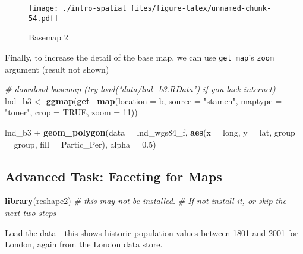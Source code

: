 \documentclass[]{article}
\newenvironment{Shaded}{}{}
\newcommand{\KeywordTok}[1]{\textcolor[rgb]{0.00,0.44,0.13}{\textbf{{#1}}}}
\newcommand{\DataTypeTok}[1]{\textcolor[rgb]{0.56,0.13,0.00}{{#1}}}
\newcommand{\DecValTok}[1]{\textcolor[rgb]{0.25,0.63,0.44}{{#1}}}
\newcommand{\FloatTok}[1]{\textcolor[rgb]{0.25,0.63,0.44}{{#1}}}
\newcommand{\StringTok}[1]{\textcolor[rgb]{0.25,0.44,0.63}{{#1}}}
\newcommand{\CommentTok}[1]{\textcolor[rgb]{0.38,0.63,0.69}{\textit{{#1}}}}
\newcommand{\OtherTok}[1]{\textcolor[rgb]{0.00,0.44,0.13}{{#1}}}
\newcommand{\NormalTok}[1]{{#1}}
\begin{document}
\begin{figure}[htbp]
\centering
\texttt{[image: ./intro-spatial\_files/figure-latex/unnamed-chunk-54.pdf]}
\caption{Basemap 2}
\end{figure}

Finally, to increase the detail of the base map, we can use
\texttt{get\_map}'s \texttt{zoom} argument (result not shown)

\begin{Shaded}
\begin{Highlighting}[]
\CommentTok{# download basemap (try load("data/lnd_b3.RData") if you lack internet)}
\NormalTok{lnd_b3 <-}\StringTok{ }\KeywordTok{ggmap}\NormalTok{(}\KeywordTok{get_map}\NormalTok{(}\DataTypeTok{location =} \NormalTok{b, }\DataTypeTok{source =} \StringTok{"stamen"}\NormalTok{,}
  \DataTypeTok{maptype =} \StringTok{"toner"}\NormalTok{, }\DataTypeTok{crop =} \OtherTok{TRUE}\NormalTok{, }\DataTypeTok{zoom =} \DecValTok{11}\NormalTok{))}
\end{Highlighting}
\end{Shaded}

\begin{Shaded}
\begin{Highlighting}[]
\NormalTok{lnd_b3 +}
\StringTok{  }\KeywordTok{geom_polygon}\NormalTok{(}\DataTypeTok{data =} \NormalTok{lnd_wgs84_f,}
               \KeywordTok{aes}\NormalTok{(}\DataTypeTok{x =} \NormalTok{long, }\DataTypeTok{y =} \NormalTok{lat, }\DataTypeTok{group =} \NormalTok{group, }\DataTypeTok{fill =} \NormalTok{Partic_Per),}
               \DataTypeTok{alpha =} \FloatTok{0.5}\NormalTok{)}
\end{Highlighting}
\end{Shaded}

\subsection{Advanced Task: Faceting for
Maps}\label{advanced-task-faceting-for-maps}

\begin{Shaded}
\begin{Highlighting}[]
\KeywordTok{library}\NormalTok{(reshape2) }\CommentTok{# this may not be installed.}
\CommentTok{# If not install it, or skip the next two steps}
\end{Highlighting}
\end{Shaded}

Load the data - this shows historic population values between 1801 and
2001 for London, again from the London data store.
\end{document}
